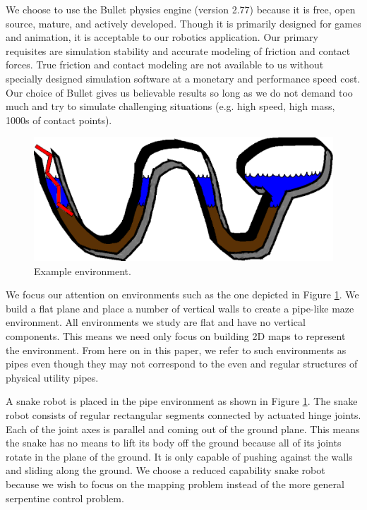 We choose to use the Bullet physics engine (version 2.77) because it is free, open source, mature, and actively developed.  Though it is primarily designed for games and animation, it is acceptable to our robotics application.  Our primary requisites are simulation stability and accurate modeling of friction and contact forces.   True friction and contact modeling are not available to us without specially designed simulation software at a monetary and performance speed cost.  Our choice of Bullet gives us believable results so long as we do not demand too much and try to simulate challenging situations (e.g. high speed, high mass, 1000s of contact points).

\begin{figure}
\begin{center}
\includegraphics[scale=0.5]{rectv2-red.eps}
\end{center}
\caption{Example environment.}
\label{env1}
\end{figure}

We focus our attention on environments such as the one depicted in Figure \ref{env1}.  We build a flat plane and place a number of vertical walls to create a pipe-like maze environment.  All environments we study are flat and have no vertical components.  This means we need only focus on building 2D maps to represent the environment.  From here on in this paper, we refer to such environments as pipes even though they may not correspond to the even and regular structures of physical utility pipes.

A snake robot is placed in the pipe environment as shown in Figure \ref{env1}.  The snake robot consists of regular rectangular segments connected by actuated hinge joints.  Each of the joint axes is parallel and coming out of the ground plane.  This means the snake has no means to lift its body off the ground because all of its joints rotate in the plane of the ground.  It is only capable of pushing against the walls and sliding along the ground.  We choose a reduced capability snake robot because we wish to focus on the mapping problem instead of the more general serpentine control problem.

